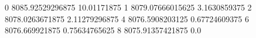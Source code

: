 0 8085.92529296875 10.01171875
1 8079.07666015625 3.1630859375
2 8078.0263671875 2.11279296875
4 8076.5908203125 0.67724609375
6 8076.669921875 0.75634765625
8 8075.91357421875 0.0
